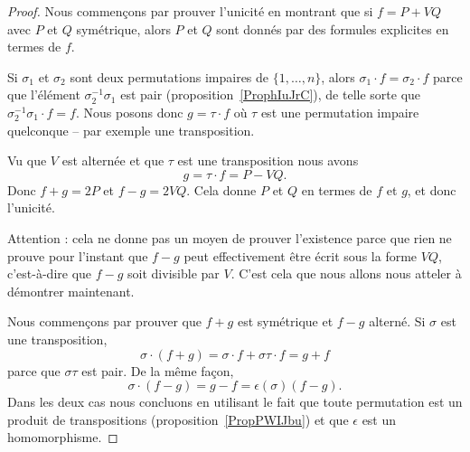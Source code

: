 \begin{proof}

	Nous commençons par prouver l'unicité en montrant que si \( f=P+VQ\) avec \( P\) et \( Q\) symétrique, alors \( P\) et \( Q\) sont donnés par des formules explicites en termes de \( f\).


	Si \( \sigma_1\) et \( \sigma_2\) sont deux permutations impaires de \( \{ 1,\ldots, n \}\), alors \( \sigma_1\cdot f=\sigma_2\cdot f\) parce que l'élément \( \sigma_2^{-1}\sigma_1\) est pair (proposition~\ref{ProphIuJrC}), de telle sorte que \( \sigma_2^{-1}\sigma_1\cdot f=f\). Nous posons donc \( g=\tau\cdot f\) où \( \tau\) est une permutation impaire quelconque -- par exemple une transposition.

	Vu que \( V\) est alternée et que \( \tau\) est une transposition nous avons
	\begin{equation}
		g=\tau\cdot f=P-VQ.
	\end{equation}
	Donc \( f+g=2P\) et \( f-g=2VQ\). Cela donne \( P\) et \( Q\) en termes de \( f\) et \( g\), et donc l'unicité.

	Attention : cela ne donne pas un moyen de prouver l'existence parce que rien ne prouve pour l'instant que \( f-g\) peut effectivement être écrit sous la forme \( VQ\), c'est-à-dire que \( f-g\) soit divisible par \( V\). C'est cela que nous allons nous atteler à démontrer maintenant.

	Nous commençons par prouver que \( f+g\) est symétrique et \( f-g\) alterné. Si \( \sigma\) est une transposition,
	\begin{equation}
		\sigma\cdot(f+g)=\sigma\cdot f+\sigma\tau\cdot f=g+f
	\end{equation}
	parce que \( \sigma\tau\) est pair. De la même façon,
	\begin{equation}
		\sigma\cdot(f-g)=g-f=\epsilon(\sigma)(f-g).
	\end{equation}
	Dans les deux cas nous concluons en utilisant le fait que toute permutation est un produit de transpositions (proposition~\ref{PropPWIJbu}) et que \( \epsilon\) est un homomorphisme.


\end{proof}
